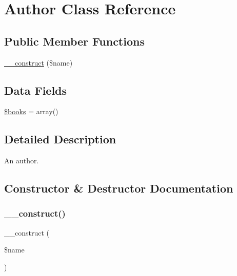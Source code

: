 \hypertarget{class_sebastian_bergmann_1_1_comparator_1_1_author}{}\section{Author Class Reference}
\label{class_sebastian_bergmann_1_1_comparator_1_1_author}
\subsection*{Public Member Functions}
\begin{DoxyCompactItemize}
\item 
\mbox{\hyperlink{class_sebastian_bergmann_1_1_comparator_1_1_author_a4717bbfc70a40a57ee741ed70766c309}{\+\_\+\+\_\+construct}} (\$name)
\end{DoxyCompactItemize}
\subsection*{Data Fields}
\begin{DoxyCompactItemize}
\item 
\mbox{\hyperlink{class_sebastian_bergmann_1_1_comparator_1_1_author_a907555e6b68ea0e7a98690e57bc2878a}{\$books}} = array()
\end{DoxyCompactItemize}


\subsection{Detailed Description}
An author. 

\subsection{Constructor \& Destructor Documentation}
\mbox{\label{class_sebastian_bergmann_1_1_comparator_1_1_author_a4717bbfc70a40a57ee741ed70766c309}} 
\subsubsection{\texorpdfstring{\+\_\+\+\_\+construct()}{\_\_construct()}}
{\footnotesize\ttfamily \+\_\+\+\_\+construct (\begin{DoxyParamCaption}\item[{}]{\$name }\end{DoxyParamCaption})}



